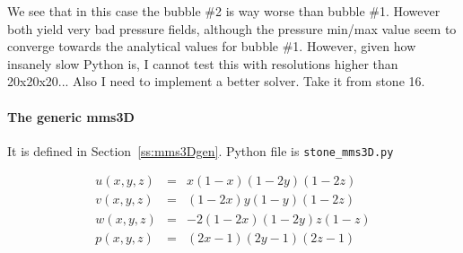 We see that in this case the bubble \#2 is way worse than bubble \#1. However both 
yield very bad pressure fields, although the pressure min/max value seem to converge 
towards the analytical values for bubble \#1. However, given how insanely slow Python 
is, I cannot test this with resolutions higher than 20x20x20...
Also I need to implement a better solver. Take it from stone 16. 


\paragraph{The generic mms3D} It is defined in Section~\ref{ss:mms3Dgen}. 
Python file is {\tt stone\_mms3D.py}

\begin{eqnarray}
u(x,y,z) &=& x(1-x)(1-2y)(1-2z)\\
v(x,y,z) &=& (1-2x) y(1-y) (1-2z) \\
w(x,y,z) &=& -2(1-2x)(1-2y)z(1-z) \\
p(x,y,z) &=& (2x-1)(2y-1)(2z-1)
\end{eqnarray}

